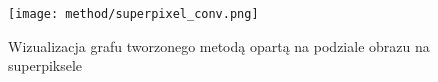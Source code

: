 {{{\begin{enumerate}
                \begin{figure}
                    \centering
                    \texttt{[image: method/superpixel\_conv.png]}
                    \caption{Wizualizacja grafu tworzonego metodą opartą na podziale obrazu na superpiksele}
                    \label{fig:method-vis-super}
                \end{figure}
            \end{enumerate}
        }
    }
}

